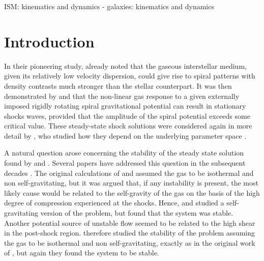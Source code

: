 \documentclass[useAMS,usenatbib]{mn2e}
\begin{document}
\begin{keywords}
ISM: kinematics and dynamics - galaxies: kinematics and dynamics
\end{keywords}

\section{Introduction}

In their pioneering study, \cite{LinShu1964} already noted that the gaseous interstellar medium, given its relatively low velocity dispersion, could give rise to spiral patterns with density contrasts much stronger than the stellar counterpart. It was then demonstrated by \cite{Fujimoto1968} and \cite{Roberts1969} that the non-linear gas response to a given externally imposed rigidly rotating spiral gravitational potential can result in stationary shocks waves, provided that the amplitude of the spiral potential exceeds some critical value. These steady-state shock solutions were considered again in more detail by \cite{Shu+1973}, who studied how they depend on the underlying parameter space \citep[see also][for a historical perspective]{Toomre1977}.

A natural question arose concerning the stability of the steady state solution found by \cite{Roberts1969} and \cite{Shu+1973}. Several papers have addressed this question in the subsequent decades \citep[e.g.][]{MishurovSuchkov1975,NelsonMatsuda1977,BalbusCowie1985,Balbus1988,DwarkadasBalbus1996,LeeShu2012,LeeShu2014,KimKimKim2014,KimKimElmegreen2015}. The original calculations of \cite{Roberts1969} and \cite{Shu+1973} assumed the gas to be isothermal and non self-gravitating, but it was argued that, if any instability is present, the most likely cause would be related to the self-gravity of the gas on the basis of the high degree of compression experienced at the shocks. Hence, \cite{BalbusCowie1985} and \cite{Balbus1988} studied a self-gravitating version of the \cite{Roberts1969} problem, but found that the system was stable. Another potential source of unstable flow seemed to be related to the high shear in the post-shock region. \cite{DwarkadasBalbus1996} therefore studied the stability of the problem assuming the gas to be isothermal and non self-gravitating, exactly as in the original work of \cite{Roberts1969}, but again they found the system to be stable.
\end{document}
